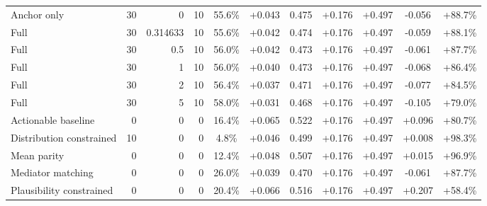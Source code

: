 \begin{table}[htbp]
\begin{tabular}{lrrrccccccc}
Anchor only & 30 & 0 & 10 & 55.6\% & +0.043 & 0.475 & +0.176 & +0.497 & -0.056 & +88.7\% \\
Full & 30 & 0.314633 & 10 & 55.6\% & +0.042 & 0.474 & +0.176 & +0.497 & -0.059 & +88.1\% \\
Full & 30 & 0.5 & 10 & 56.0\% & +0.042 & 0.473 & +0.176 & +0.497 & -0.061 & +87.7\% \\
Full & 30 & 1 & 10 & 56.0\% & +0.040 & 0.473 & +0.176 & +0.497 & -0.068 & +86.4\% \\
Full & 30 & 2 & 10 & 56.4\% & +0.037 & 0.471 & +0.176 & +0.497 & -0.077 & +84.5\% \\
Full & 30 & 5 & 10 & 58.0\% & +0.031 & 0.468 & +0.176 & +0.497 & -0.105 & +79.0\% \\
Actionable baseline & 0 & 0 & 0 & 16.4\% & +0.065 & 0.522 & +0.176 & +0.497 & +0.096 & +80.7\% \\
Distribution constrained & 10 & 0 & 0 & 4.8\% & +0.046 & 0.499 & +0.176 & +0.497 & +0.008 & +98.3\% \\
Mean parity & 0 & 0 & 0 & 12.4\% & +0.048 & 0.507 & +0.176 & +0.497 & +0.015 & +96.9\% \\
Mediator matching & 0 & 0 & 0 & 26.0\% & +0.039 & 0.470 & +0.176 & +0.497 & -0.061 & +87.7\% \\
Plausibility constrained & 0 & 0 & 0 & 20.4\% & +0.066 & 0.516 & +0.176 & +0.497 & +0.207 & +58.4\% \\
\bottomrule
\end{tabular}
\end{table}